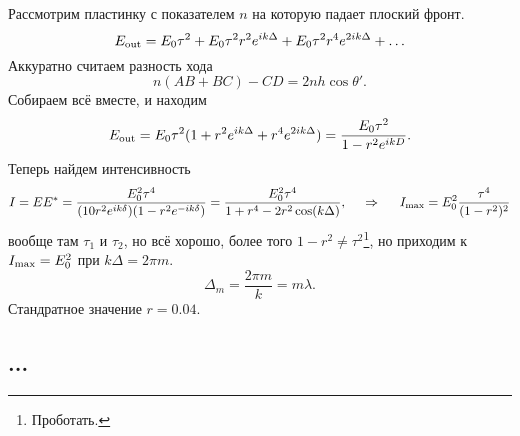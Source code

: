 Рассмотрим пластинку с показателем $n$ на которую падает плоский фронт.
\begin{equation*}
    E_{\textnormal{out}} = E_0 \tau^2 + E_0 \tau^2 r^2 e^{i k \Delta} + 
    E_0 \tau^2 r^4 e^{2ik \Delta} + \ldots
\end{equation*}
Аккуратно считаем разность хода
\begin{equation*}
    n (AB + BC) - CD = 2 n h \cos \theta'.
\end{equation*}
Собираем всё вместе, и находим
\begin{equation*}
    E_{\textnormal{out}} = E_0 \tau^2 (1 + r^2 e^{ik\Delta} + r^4 e^{2ik \Delta}) = 
    \frac{E_0 \tau^2}{1-r^2 e^{ikD}}.
\end{equation*}
Теперь найдем интенсивность
\begin{equation*}
    I = E E^* = \frac{E_0^2 \tau^4}{(10r^2 e^{ik\delta})(1-r^2 e^{-ik\delta})} = 
    \frac{E_0^2 \tau^4}{1 + r^4 - 2 r^2 \cos (k \Delta)},
    \hspace{0.5cm} \Rightarrow \hspace{0.5cm}
    I_{\textnormal{max}} = E_0^2 \frac{\tau^4}{(1-r^2)^2}
\end{equation*}
вообще там $\tau_1$ и $\tau_2$, но всё хорошо, более того $1-r^2 \neq \tau^2$\footnote{
    Проботать.
}, но приходим к $I_{\textnormal{max}} = E_0^2$ при $k \Delta = 2 \pi m$.
\begin{equation*}
    \Delta_m = \frac{2\pi m}{k} = m \lambda.
\end{equation*}
Стандратное значение $r = 0.04$.

\subsection*{...}

